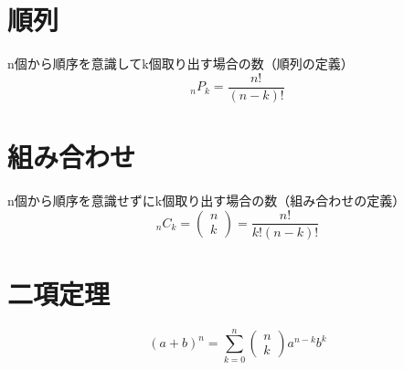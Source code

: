 \documentclass[fleqn,leqno,autodetect-engine,dvipdfmx-if-dvi,ja=standard]{bxjsarticle}
\begin{document}
\section{順列}

n個から順序を意識してk個取り出す場合の数（順列の定義）
\[ {}_n P _k  =  \frac{n!}{(n-k)!} \]

\section{組み合わせ}

n個から順序を意識せずにk個取り出す場合の数（組み合わせの定義）
\[ {}_n C _k = \left(
               \begin{array}{c}
                 n \\
                 k 
	       \end{array}
               \right) = \frac{n!}{k!(n-k)!}  
\]

\section{二項定理}

\[
 (a + b)^n = \sum_{k=0}^n \left(
                             \begin{array}{c}
                             n \\
                             k 
	                     \end{array}
                             \right) a^{n-k} b^k
\]
\end{document}

